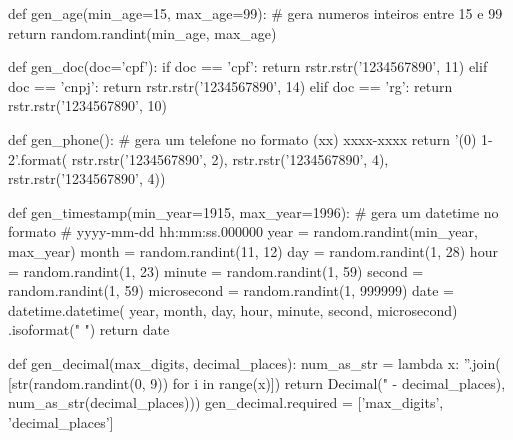 \documentclass{beamer}
\begin{document}
{\begin{frame}[fragile]
\begin{pythoncode}
def gen_age(min_age=15, max_age=99):
    # gera numeros inteiros entre 15 e 99
    return random.randint(min_age, max_age)
\end{pythoncode}

\end{frame}

\begin{frame}[fragile]

\begin{pythoncode}
def gen_doc(doc='cpf'):
    if doc == 'cpf':
        return rstr.rstr('1234567890', 11)
    elif doc == 'cnpj':
        return rstr.rstr('1234567890', 14)
    elif doc == 'rg':
        return rstr.rstr('1234567890', 10)
\end{pythoncode}	

\end{frame}

\begin{frame}[fragile]
	
\begin{pythoncode}
def gen_phone():
    # gera um telefone no formato (xx) xxxx-xxxx
    return '({0}) {1}-{2}'.format(
        rstr.rstr('1234567890', 2),
        rstr.rstr('1234567890', 4),
        rstr.rstr('1234567890', 4))
\end{pythoncode}

\end{frame}

\begin{frame}[fragile]

\begin{pythoncode}
def gen_timestamp(min_year=1915, max_year=1996):
    # gera um datetime no formato
    # yyyy-mm-dd hh:mm:ss.000000
    year = random.randint(min_year, max_year)
    month = random.randint(11, 12)
    day = random.randint(1, 28)
    hour = random.randint(1, 23)
    minute = random.randint(1, 59)
    second = random.randint(1, 59)
    microsecond = random.randint(1, 999999)
    date = datetime.datetime(
        year, month, day, hour, minute, 
        second, microsecond)
        .isoformat(" ")
    return date
\end{pythoncode}

\end{frame}


\begin{frame}[fragile]
	
\begin{pythoncode}
def gen_decimal(max_digits, decimal_places):
  num_as_str = lambda x: ''.join(
    [str(random.randint(0, 9)) for i in range(x)])
  return Decimal("%
                            - decimal_places),
                            num_as_str(decimal_places)))
gen_decimal.required = ['max_digits', 'decimal_places']
\end{pythoncode}


\end{frame}}
\end{document}
